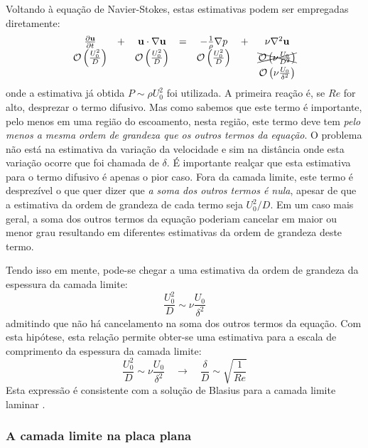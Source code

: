 \documentclass[article,12pt,oneside,a4paper,english,brazil,sumario=tradicional]{abntex2}
\newcommand{\p}[1]{\ensuremath{ \mathbf{#1}}}    %
\newcommand{\lra}{\ensuremath{\longrightarrow}}
\newcommand{\qrq}{\ensuremath{\quad\lra\quad}}
\newcommand{\pd}{\ensuremath{\partial}}
\newcommand{\bigO}[1]{\ensuremath{\mathcal{O}\left(#1\right)}}
\begin{document}
Voltando à equação de Navier-Stokes, estas estimativas podem ser empregadas diretamente:
\begin{equation}
\begin{matrix}
\frac{\pd\p{u}}{\pd t}& +& \p{u}\cdot\nabla\p{u}& = &-\frac{1}{\rho}\nabla p& +& \nu\nabla^2\p{u}\\
\bigO{\frac{U_0^2}{D}}& & \bigO{\frac{U_0^2}{D}} &  & \bigO{\frac{U_0^2}{D}}&  & \xcancel{\bigO{\nu\frac{U_0}{D^2}}} \\
 & & & & & & \bigO{\nu\frac{U_0}{\delta^2}}\\
\end{matrix}
\label{eq:ns-o}
\end{equation}
onde a estimativa já obtida $P\sim \rho U_0^2$ foi utilizada. A primeira reação é, se $Re$ for alto, desprezar o termo difusivo. Mas como sabemos que este termo é importante, pelo menos em uma região do escoamento, nesta região, este termo deve tem \emph{pelo menos a mesma ordem de grandeza que os outros termos da equação}. O problema não está na estimativa da variação da velocidade e sim na distância onde esta variação ocorre que foi chamada de $\delta$. É importante realçar que esta estimativa para o termo difusivo é apenas o pior caso. Fora da camada limite, este termo é desprezível o que quer dizer que \emph{a soma dos outros termos é nula}, apesar de que a estimativa da ordem de grandeza de cada termo seja $U_0^2/D$. Em um caso mais geral, a soma dos outros termos da equação poderiam cancelar em maior ou menor grau resultando em diferentes estimativas da ordem de grandeza deste termo.

Tendo isso em mente, pode-se chegar a uma estimativa da ordem de grandeza da espessura da camada limite:
\[
\frac{U_0^2}{D} \sim \nu\frac{U_0}{\delta^2}
\]
admitindo que não há cancelamento na soma dos outros termos da equação. Com esta hipótese, esta relação permite obter-se uma estimativa para a escala de comprimento da espessura da camada limite:
\begin{equation}
\frac{U_0^2}{D} \sim \nu\frac{U_0}{\delta^2} \qrq \frac{\delta}{D} \sim \sqrt{\frac{1}{Re}}
\label{eq:delta}
\end{equation}
Esta expressão é consistente com a solução de Blasius para a camada limite laminar \cite{Tritton88}.



\subsubsection{A camada limite na placa plana}
\end{document}
